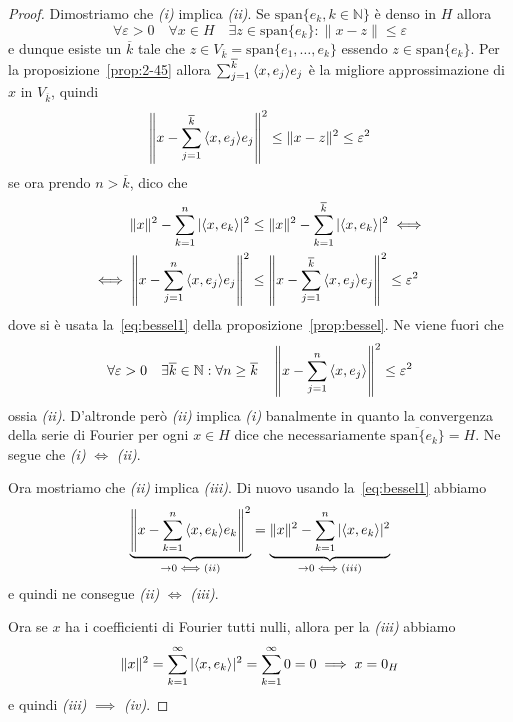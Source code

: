 \begin{proof}
    Dimostriamo che \textit{(i)} implica \textit{(ii)}. Se \(\mathrm{span}
    \{e_{k}, k \in \mathbb{N}\} \) è denso in \(H\) allora 
    \[
      \forall \varepsilon > 0 \quad \forall x \in H \quad \exists z \in
      \mathrm{span}\{e_{k}\} : \|x - z\| \le \varepsilon
    \]
    e dunque esiste un \(\overline{k}\) tale che \(z \in V_{\overline{k}} =
    \mathrm{span}\{e_{1}, \dots, e_{k}\}  \)
    essendo \(z \in \mathrm{span}\{e_{k}\}\). Per la
    proposizione~\ref{prop:2-45} allora \(\sum_{j=1}^{\overline{k}} {\left\langle x,
    e_{j}\right\rangle} e_{j}\) è la migliore approssimazione di \(x\) in \(V_{\overline{k}}
    \), quindi 
    \[
      \left\|x - \sum_{j=1}^{\overline{k}} {\left\langle x, e_{j}\right\rangle} e_{j} \right\|^2 \le
      \|x - z\|^2 \le \varepsilon^2
    \]
    se ora prendo \(n > \overline{k}\), dico che
    \begin{align*}
        \|x\|^2 - \sum_{k=1}^{n} |{\left\langle x, e_{k}\right\rangle}|^2 &\le \|x\|^2 -
        \sum_{k=1}^{\overline{k}} |{\left\langle x, e_{k}\right\rangle}|^2 \iff \\ \iff
        \left\|x - \sum_{j=1}^{n} {\left\langle x, e_{j}\right\rangle}e_{j}  \right\|^2 &\le \left\| x
        - \sum_{j=1}^{\overline{k}} {\left\langle x, e_{j}\right\rangle} e_{j} \right\|^2 \le
        \varepsilon^2
    \end{align*} dove si è usata la~\eqref{eq:bessel1} della
    proposizione~\ref{prop:bessel}. Ne viene fuori che 
    \[
      \forall \varepsilon > 0 \quad \exists \overline{k} \in \mathbb{N} :
      \forall n \ge \overline{k} \quad \left\|x - \sum_{j=1}^{n} {\left\langle x,
      e_{j}\right\rangle}\right\|^2 \le \varepsilon^2
    \]
    ossia \textit{(ii)}. D'altronde però \textit{(ii)} implica \textit{(i)}
    banalmente in quanto la convergenza della serie di Fourier per ogni \(x \in
    H\) dice che necessariamente \(\overline{\mathrm{span}\{e_{k}\}} = H\). Ne
    segue che \textit{(i)} \(\iff\) \textit{(ii)}.

    Ora mostriamo che \textit{(ii)} implica \textit{(iii)}.
    Di nuovo usando la~\eqref{eq:bessel1} abbiamo
    \[
        \underbrace{\left\| x - \sum_{k=1}^{n} {\left\langle x, e_{k}\right\rangle} e_{k}
        \right\|^2}_{\to 0 \iff (ii)}  =
      \underbrace{\|x\|^2 - \sum_{k=1}^{n} |{\left\langle x, e_{k}\right\rangle} |^2}_{\to 0 \iff
      (iii)} 
    \]
    e quindi ne consegue \textit{(ii)} \(\iff\) \textit{(iii)}. 

    Ora se \(x\) ha i coefficienti di Fourier tutti nulli, allora per la
    \textit{(iii)} abbiamo
    \[
      \|x\|^2 = \sum_{k=1}^{\infty} |{\left\langle x, e_{k}\right\rangle} |^2 = \sum_{k=1}^{\infty} 0
      = 0 \implies x = 0_H
    \]
    e quindi \textit{(iii)} \(\implies\) \textit{(iv)}. 


\end{proof}
